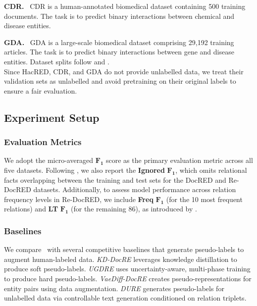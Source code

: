 \noindent
\textbf{CDR.} \ CDR is a human-annotated biomedical dataset containing 500 training documents. The task is to predict binary interactions between chemical and disease entities.

\noindent
\textbf{GDA.} \ GDA is a large-scale biomedical dataset comprising 29,192 training articles. The task is to predict binary interactions between gene and disease entities. Dataset splits follow \citet{christopoulou2019connecting} and \citet{zhou2021document}. \\

\noindent
Since HacRED, CDR, and GDA do not provide unlabelled data, we treat their validation sets as unlabelled and avoid pretraining on their original labels to ensure a fair evaluation.

\subsection{Experiment Setup}
\subsubsection{Evaluation Metrics}
We adopt the micro-averaged $\mathbf{F_1}$ score as the primary evaluation metric across all five datasets. Following \citet{yao2019docred}, we also report the \textbf{Ignored} $\mathbf{F_1}$, which omits relational facts overlapping between the training and test sets for the DocRED and Re-DocRED datasets. Additionally, to assess model performance across relation frequency levels in Re-DocRED, we include \textbf{Freq} $\mathbf{F_1}$ (for the 10 most frequent relations) and \textbf{LT} $\mathbf{F_1}$ (for the remaining 86), as introduced by \citet{tan2022revisiting}.

\subsubsection{Baselines}
We compare \model\, with several competitive baselines that generate pseudo-labels to augment human-labeled data. \textit{KD-DocRE} \citep{tan2022document} leverages knowledge distillation to produce soft pseudo-labels. \textit{UGDRE} \citep{sun2023uncertainty} uses uncertainty-aware, multi-phase training to produce hard pseudo-labels. \textit{VaeDiff-DocRE} \citep{tran2025vaediff} creates pseudo-representations for entity pairs using data augmentation. \textit{DURE} \citep{feng2024dure} generates pseudo-labels for unlabelled data via controllable text generation conditioned on relation triplets.

